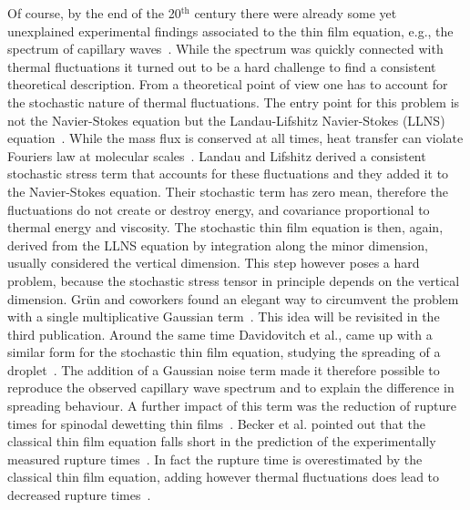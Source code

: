 Of course, by the end of the 20$^{\text{th}}$ century there were already some yet unexplained experimental findings associated to the thin film equation, e.g., the spectrum of capillary waves~\cite{vrijRuptureThinLiquid1968}.
While the spectrum was quickly connected with thermal fluctuations it turned out to be a hard challenge to find a consistent theoretical description.
From a theoretical point of view one has to account for the stochastic nature of thermal fluctuations.
The entry point for this problem is not the Navier-Stokes equation but the Landau-Lifshitz Navier-Stokes (LLNS) equation~\cite{landauFluidMechanicsLandau2013}.
While the mass flux is conserved at all times, heat transfer can violate Fouriers law at molecular scales~\cite{bellNumericalMethodsStochastic2007}.
Landau and Lifshitz derived a consistent stochastic stress term that accounts for these fluctuations and they added it to the Navier-Stokes equation.
Their stochastic term has zero mean, therefore the fluctuations do not create or destroy energy, and covariance proportional to thermal energy and viscosity. 
The stochastic thin film equation is then, again, derived from the LLNS equation by integration along the minor dimension, usually considered the vertical dimension.
This step however poses a hard problem, because the stochastic stress tensor in principle depends on the vertical dimension.
Grün and coworkers found an elegant way to circumvent the problem with a single multiplicative Gaussian term~\cite{grunThinFilmFlowInfluenced2006, meckeThermalFluctuationsThin2005, fetzerThermalNoiseInfluences2007, zhangNanoscaleThinfilmFlows2020, zhangMolecularSimulationThin2019, nesicFullyNonlinearDynamics2015}. 
This idea will be revisited in the third publication.
Around the same time Davidovitch et al., came up with a similar form for the stochastic thin film equation, studying the spreading of a droplet~\cite{davidovitchSpreadingViscousFluid2005}.
The addition of a Gaussian noise term made it therefore possible to reproduce the observed capillary wave spectrum and to explain the difference in spreading behaviour.
A further impact of this term was the reduction of rupture times for spinodal dewetting thin films~\cite{grunThinFilmFlowInfluenced2006, fetzerThermalNoiseInfluences2007}.
Becker et al. pointed out that the classical thin film equation falls short in the prediction of the experimentally measured rupture times~\cite{beckerComplexDewettingScenarios2003}.
In fact the rupture time is overestimated by the classical thin film equation, adding however thermal fluctuations does lead to decreased rupture times~\cite{duran-olivenciaInstabilityRuptureFluctuations2019, shahThermalFluctuationsCapillary2019}.

